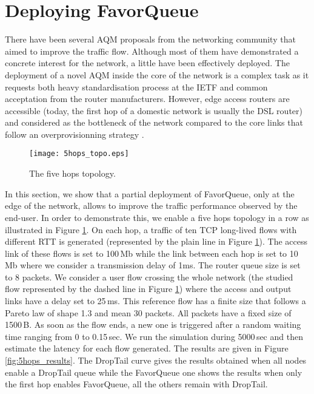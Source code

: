 \documentclass{elsart}
\begin{document}
\section{Deploying FavorQueue}
\label{sec:5hops}

There have been several AQM proposals from the networking community that aimed to improve the traffic flow. Although most of them have demonstrated a concrete interest for the network, a little have been effectively deployed. The deployment of a novel AQM inside the core of the network is a complex task as it requests both heavy standardisation process at the IETF and common acceptation from the router manufacturers. However, edge access routers are accessible (today, the first hop of a domestic network is usually the DSL router) and considered as the bottleneck of the network compared to the core links that follow an overprovisionning strategy \cite{poplevel}. 

\begin{figure}[htb!]
   	\centering
	\texttt{[image: 5hops\_topo.eps]}
	\caption{The five hops topology.}
	\label{fig:5hops}
\end{figure}

In this section, we show that a partial deployment of FavorQueue, only at the edge of the network, allows to improve the traffic performance observed by the end-user. In order to demonstrate this, we enable a five hops topology in a row as illustrated in Figure \ref{fig:5hops}. On each hop, a traffic of ten TCP long-lived flows with different RTT is generated (represented by the plain line in Figure \ref{fig:5hops}). The access link of these flows is set to 100\,Mb while the link between each hop is set to 10\,Mb where we consider a transmission delay of 1ms. The router queue size is set to 8 packets. We consider a user flow crossing the whole network (the studied flow represented by the dashed line in Figure \ref{fig:5hops}) where the access and output links have a delay set to 25\,ms. This reference flow has a finite size that follows a Pareto law of shape 1.3 and mean 30 packets. All packets have a fixed size of 1500\,B. As soon as the flow ends, a new one is triggered after a random waiting time ranging from 0 to 0.15\,sec. We run the simulation during 5000\,sec and then estimate the latency for each flow generated.
The results are given in Figure \ref{fig:5hops_results}. The DropTail curve gives the results obtained when all nodes enable a DropTail queue while the FavorQueue one shows the results when only the first hop enables FavorQueue, all the others remain with DropTail.
\end{document}
